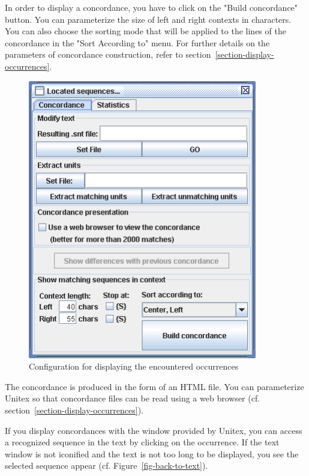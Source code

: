 \bigskip
{}
\noindent In order to display a concordance, you have to click on the "Build
concordance" button. You can parameterize the size of left and right contexts in characters.
You can also choose the sorting mode that will be applied to the lines of the
concordance in the "Sort According to" menu. For further details on the
parameters of concordance construction, refer to
section~\ref{section-display-occurrences}.

\bigskip
\begin{figure}[h]
\begin{center}
\includegraphics[width=10cm]{resources/img/fig6-31.png}
\caption{Configuration for displaying the encountered occurrences
\label{fig-configuration-display-occurrences}}
\end{center}
\end{figure}

\noindent The concordance is produced in the form of an HTML file.
 You can parameterize Unitex  so that concordance files 
can be read using a web browser
(cf. section~\ref{section-display-occurrences}).

\bigskip
\noindent If you display concordances with the window provided by Unitex,
you can access a recognized sequence in the text by clicking on the occurrence. If
the text window is not iconified and the text is not too long to be displayed,
you see the selected sequence appear (cf.
Figure~\ref{fig-back-to-text}).

